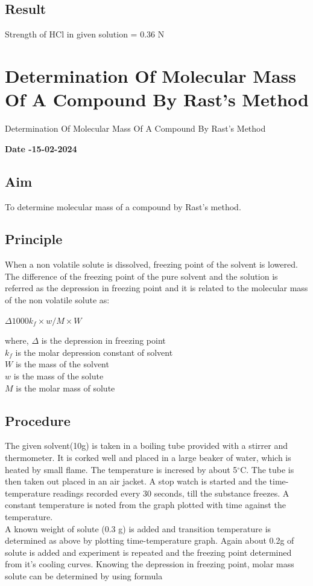 \documentclass{report}
\newcommand{\toclineinsert}[3][25mm]{%
    \dotfill\ #2\makebox[#1][l]{#3\dotfill}%
}
\begin{document}
\section*{Result}
Strength of HCl in given solution = 0.36 N

\chapter*{Determination Of Molecular Mass Of A Compound By Rast's Method}
 {Determination Of Molecular Mass Of A Compound By Rast's Method \toclineinsert{}{15-02-2024}}
\begin{center}
    \LARGE
     \textbf{Date -15-02-2024}
\end{center}

\section*{Aim}
To determine molecular mass of a compound by Rast's method.
\section*{Principle}
When a non volatile solute is dissolved, freezing point of the solvent is lowered. The difference of the freezing point of the pure solvent and the solution is referred as the depression in freezing point and it is related to the molecular mass of the non volatile solute as:\\
\begin{center}
    $\Delta 1000k_f \times w/ M \times W$
\end{center}
where, $\Delta$ is the depression in freezing point\\
$k_f$ is the molar depression constant of solvent\\
$W$ is the mass of the solvent\\
$w$ is the mass of the solute\\
$M$ is the molar mass of solute
\section*{Procedure}
The given solvent(10g) is taken in a boiling tube provided with a stirrer and thermometer. It is corked well and placed in a large beaker of water, which is heated by small flame. The temperature is incresed by about 5$^\circ$C. The tube is then taken out placed in an air jacket. A stop watch is started  and the time-temperature readings recorded every 30 seconds, till the substance freezes. A constant temperature is noted from the graph plotted with time against the temperature.\\
A known weight of solute (0.3 g) is added and transition temperature is determined as above by plotting time-temperature graph. Again about 0.2g of solute is added and experiment is repeated and the freezing point determined from it's cooling curves. Knowing the depression in freezing point, molar mass solute can be determined by using formula
\pagebreak
\end{document}
